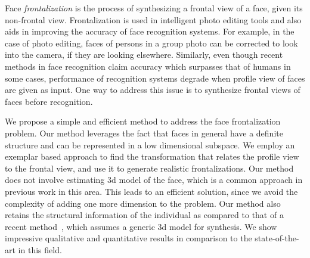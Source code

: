 Face \emph{ frontalization} is the process of synthesizing a frontal view of a face, given its non-frontal view.
Frontalization is used in intelligent photo editing tools and also aids in improving the accuracy of 
face recognition systems.
For example, in the case of photo editing, faces of persons in a group photo can be
corrected to look into the camera, if they are looking elsewhere.
Similarly, even though recent methods in face recognition claim accuracy 
which surpasses that of humans in some cases, performance of 
recognition systems degrade when profile view of faces are given as input. One
way to address this issue is to synthesize frontal views of faces before recognition.

We propose a simple and efficient method to address the face frontalization problem. Our method leverages the fact that 
faces in general have a definite structure and can be represented in a low dimensional subspace. We employ an exemplar 
based approach to find the transformation that relates the profile view to the frontal view, and use
it to generate realistic frontalizations.
Our method does not involve estimating {\sc 3d} model of the face, which is a common approach in previous
work in this area. This leads to an efficient solution, since we avoid the complexity 
of adding one more dimension to the problem. Our method also retains the structural information of the individual as compared to 
that of a recent method~\cite{DBLP:journals/corr/HassnerHPE14}, which assumes a generic {\sc 3d} model for synthesis. 
We show impressive qualitative and quantitative results in comparison to the state-of-the-art in
this field.

